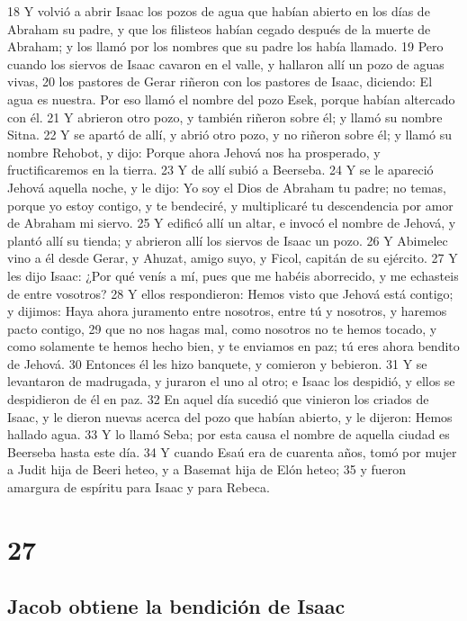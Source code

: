 18 Y volvió a abrir Isaac los pozos de agua que habían abierto en los días de Abraham su padre, y que los filisteos habían cegado después de la muerte de Abraham; y los llamó por los nombres que su padre los había llamado.
19 Pero cuando los siervos de Isaac cavaron en el valle, y hallaron allí un pozo de aguas vivas,
20 los pastores de Gerar riñeron con los pastores de Isaac, diciendo: El agua es nuestra. Por eso llamó el nombre del pozo Esek, porque habían altercado con él.
21 Y abrieron otro pozo, y también riñeron sobre él; y llamó su nombre Sitna.
22 Y se apartó de allí, y abrió otro pozo, y no riñeron sobre él; y llamó su nombre Rehobot, y dijo: Porque ahora Jehová nos ha prosperado, y fructificaremos en la tierra.
23 Y de allí subió a Beerseba.
24 Y se le apareció Jehová aquella noche, y le dijo: Yo soy el Dios de Abraham tu padre; no temas, porque yo estoy contigo, y te bendeciré, y multiplicaré tu descendencia por amor de Abraham mi siervo.
25 Y edificó allí un altar, e invocó el nombre de Jehová, y plantó allí su tienda; y abrieron allí los siervos de Isaac un pozo.
26 Y Abimelec vino a él desde Gerar, y Ahuzat, amigo suyo, y Ficol, capitán de su ejército.
27 Y les dijo Isaac: ¿Por qué venís a mí, pues que me habéis aborrecido, y me echasteis de entre vosotros?
28 Y ellos respondieron: Hemos visto que Jehová está contigo; y dijimos: Haya ahora juramento entre nosotros, entre tú y nosotros, y haremos pacto contigo,
29 que no nos hagas mal, como nosotros no te hemos tocado, y como solamente te hemos hecho bien, y te enviamos en paz; tú eres ahora bendito de Jehová.
30 Entonces él les hizo banquete, y comieron y bebieron.
31 Y se levantaron de madrugada, y juraron el uno al otro; e Isaac los despidió, y ellos se despidieron de él en paz.
32 En aquel día sucedió que vinieron los criados de Isaac, y le dieron nuevas acerca del pozo que habían abierto, y le dijeron: Hemos hallado agua.
33 Y lo llamó Seba; por esta causa el nombre de aquella ciudad es Beerseba hasta este día.
34 Y cuando Esaú era de cuarenta años, tomó por mujer a Judit hija de Beeri heteo, y a Basemat hija de Elón heteo;
35 y fueron amargura de espíritu para Isaac y para Rebeca.

\chapter{27}

\section{Jacob obtiene la bendición de Isaac}

